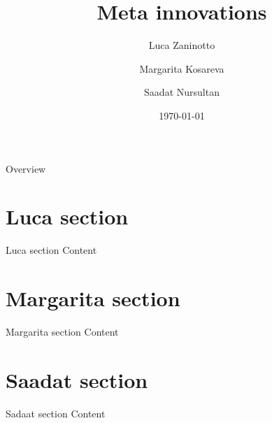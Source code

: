 \documentclass{beamer}
\title{Meta innovations}
\author[Luca,Margarita,Saadat]{Luca Zaninotto \and Margarita Kosareva \and Saadat Nursultan}
\institute{Univerità di Padova}
\date{\today}
\begin{document}
\begin{frame}
  \titlepage
\end{frame}

\begin{frame}{Overview}
  \tableofcontents
\end{frame}

\section{Luca section}
\begin{frame}{Luca section}
  Content
\end{frame}

\section{Margarita section}
\begin{frame}{Margarita section}
  Content
\end{frame}

\section{Saadat section}
\begin{frame}{Sadaat section}
  Content
\end{frame}
\end{document}
